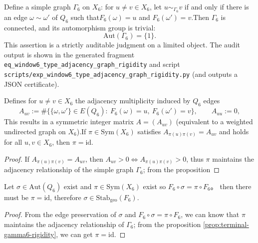 \begin{enumerate}
\begin{proposition}[Type adjacency graph rigid elimination "relabeled degrees of freedom": \texorpdfstring{XPH0X}{Aut(Gamma6)=1}]\label{prop:terminal-gamma6-rigidity}Define a simple graph \(\Gamma_6\) on \(X_6\): for \(u\neq v\in X_6\), let \(u\sim_{\Gamma_6} v\) if and only if there is an edge \(\omega\sim\omega'\) of \(Q_6\) such that\(F_6(\omega)=u\) and \(F_6(\omega')=v\).Then \(\Gamma_6\) is connected, and its automorphism group is trivial:  \[
  \mathrm{Aut}(\Gamma_6)=\{1\}.
  \]
This assertion is a strictly auditable judgment on a limited object. The audit output is shown in the generated fragment \texttt{eq\_window6\_type\_adjacency\_graph\_rigidity} and script \texttt{scripts/exp\_window6\_type\_adjacency\_graph\_rigidity.py} (and outputs a JSON certificate).  \end{proposition}
  

\begin{corollary}\label{cor:terminal-gamma6-multiplicity-rigidity}Defines for \(u\neq v\in X_6\) the adjacency multiplicity induced by \(Q_6\) edges  \[
  A_{uv}
  :=\#\bigl\{\{\omega,\omega'\}\in E(Q_6):\ F_6(\omega)=u,\ F_6(\omega')=v\bigr\},
  \qquad A_{uu}:=0,
  \]
This results in a symmetric integer matrix \(A=(A_{uv})\) (equivalent to a weighted undirected graph on \(X_6\)).If \(\pi\in\mathrm{Sym}(X_6)\) satisfies \(A_{\pi(u)\pi(v)}=A_{uv}\) and holds for all \(u,v\in X_6\), then \(\pi=\mathrm{id}\).  \begin{proof}
If \(A_{\pi(u)\pi(v)}=A_{uv}\), then \(A_{uv}>0\iff A_{\pi(u)\pi(v)}>0\), thus \(\pi\) maintains the adjacency relationship of the simple graph \(\Gamma_6\); from the proposition  \end{proof}
  \end{corollary}

\begin{corollary}\label{cor:terminal-foldbin6-no-type-relabeling-by-geo}Let \(\sigma\in \mathrm{Aut}(Q_6)\) exist and \(\pi\in\mathrm{Sym}(X_6)\) exist so  \(
  F_6\circ\sigma=\pi\circ F_6
  \)。
then there must be \(\pi=\mathrm{id}\), therefore \(\sigma\in \mathrm{Stab}_{\mathrm{geo}}(F_6)\).  \begin{proof}
From the edge preservation of \(\sigma\) and \(F_6\circ\sigma=\pi\circ F_6\), we can know that \(\pi\) maintains the adjacency relationship of \(\Gamma_6\); from the proposition \ref{prop:terminal-gamma6-rigidity}, we can get \(\pi=\mathrm{id}\).  \end{proof}
  \end{corollary}


\end{enumerate}
